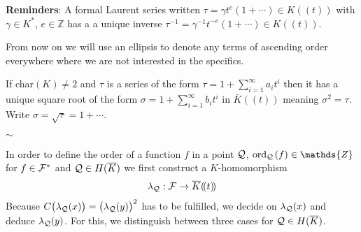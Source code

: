 \documentclass[english,11pt,a4paper]{article}
\begin{document}
\vspace{3mm}

\textbf{Reminders}: A formal Laurent series written $\tau = \gamma t^e (1 + \cdots)\in K (\! (t)\! )$ with $\gamma \in K^*$, $e \in \mathds{Z}$ has a a unique inverse $\tau^{-1} = \gamma^{-1} t^{-e} (1 + \cdots) \in K (\! (t)\! )$.

From now on we will use an ellipsis to denote any terms of ascending order everywhere where we are not interested in the specifics.

If char$(K) \neq 2$ and $\tau$ is a series of the form $\tau = 1 + \sum_{i = 1}^{\infty} a_i t^i$ then it has a unique square root of the form $\sigma = 1+\sum_{i = 1}^{\infty} b_i t^i$ in $\bar K (\! (t)\! )$ meaning $\sigma^2 = \tau$. Write $\sigma = \sqrt \tau = 1 + \cdots$.

\vspace{-3mm}
\begin{center}
$\sim$
\end{center}

In order to define the order of a function $f$ in a point $\mathcal{Q}$, $\ordq (f) \in \mathds{Z}$ for $f \in \mathcal{F}^*$ and $\mathcal{Q} \in H(\overline K)$ we first construct a $K$-homomorphism
\begin{align*}
  \lambda_{\mathcal{Q}}: \mathcal{F} \rightarrow \overline K (\! (t)\! )
\end{align*}
Because $C\big(\lambda_{\mathcal{Q}}(x)\big)=\big(\lambda_{\mathcal{Q}}(y)\big)^2$ has to be fulfilled, we decide on $\lambda_{\mathcal{Q}}(x)$ and deduce $\lambda_{\mathcal{Q}}(y)$. For this, we distinguish between three cases for $\mathcal{Q} \in H(\overline K)$.

\newpage
\end{document}
